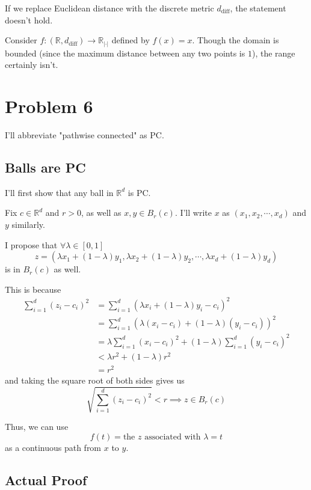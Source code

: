 \documentclass[12pt]{article}
\newcommand{\R}{\mathbb{R}}
\begin{document}
If we replace Euclidean distance with the discrete metric $d_\text{diff}$, the statement doesn't hold.

Consider $f: (\R, d_\text{diff}) \to \R_{|\cdot|}$ defined by $f(x)=x$.
Though the domain is bounded (since the maximum distance between any two points is $1$),
the range certainly isn't.

\pagebreak

\section{Problem 6}

I'll abbreviate "pathwise connected" as PC.

\subsection{Balls are PC}\label{sec:prob6lemma}

I'll first show that any ball in $\R^d$ is PC.

Fix $c \in \R^d$ and $r > 0$, as well as $x, y \in B_r(c)$.
I'll write $x$ as $(x_1, x_2, \cdots, x_d)$ and $y$ similarly.

I propose that $\forall \lambda \in [0, 1]$
\[z=(\lambda x_1 + (1-\lambda) y_1, \lambda x_2 + (1-\lambda) y_2, \cdots, \lambda x_d + (1-\lambda) y_d)\]
is in $B_r(c)$ as well.

This is because
\begin{align*}
  \sum_{i=1}^{d} (z_i-c_i)^2
   & = \sum_{i=1}^{d} (\lambda x_i + (1-\lambda) y_i - c_i)^2                      \\
   & = \sum_{i=1}^{d} (\lambda (x_i - c_i) + (1-\lambda)(y_i-c_i))^2               \\
   & = \lambda \sum_{i=1}^{d} (x_i-c_i)^2 + (1-\lambda) \sum_{i=1}^{d} (y_i-c_i)^2 \\
   & < \lambda r^2 + (1-\lambda) r^2                                               \\
   & = r^2
\end{align*}
and taking the square root of both sides gives us
\[\sqrt{\sum_{i=1}^{d} (z_i-c_i)^2} < r \implies z \in B_r(c)\]

Thus, we can use
\[f(t)=\text{the $z$ associated with $\lambda=t$}\]
as a continuous path from $x$ to $y$.

\pagebreak

\subsection{Actual Proof}
\end{document}
